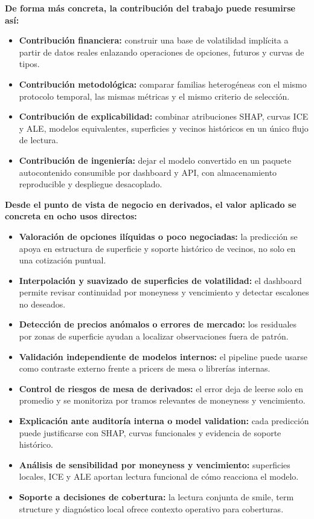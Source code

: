 \textbf{De forma más concreta, la contribución del trabajo puede resumirse así:}

\begin{itemize}
  \item \textbf{Contribución financiera:} construir una base de volatilidad implícita a partir de datos reales enlazando operaciones de opciones, futuros y curvas de tipos.
  \item \textbf{Contribución metodológica:} comparar familias heterogéneas con el mismo protocolo temporal, las mismas métricas y el mismo criterio de selección.
  \item \textbf{Contribución de explicabilidad:} combinar atribuciones SHAP, curvas ICE y ALE, modelos equivalentes, superficies y vecinos históricos en un único flujo de lectura.
  \item \textbf{Contribución de ingeniería:} dejar el modelo convertido en un paquete autocontenido consumible por dashboard y API, con almacenamiento reproducible y despliegue desacoplado.
\end{itemize}

\textbf{Desde el punto de vista de negocio en derivados, el valor aplicado se concreta en ocho usos directos:}

\begin{itemize}
  \item \textbf{Valoración de opciones ilíquidas o poco negociadas:} la predicción se apoya en estructura de superficie y soporte histórico de vecinos, no solo en una cotización puntual.
  \item \textbf{Interpolación y suavizado de superficies de volatilidad:} el dashboard permite revisar continuidad por moneyness y vencimiento y detectar escalones no deseados.
  \item \textbf{Detección de precios anómalos o errores de mercado:} los residuales por zonas de superficie ayudan a localizar observaciones fuera de patrón.
  \item \textbf{Validación independiente de modelos internos:} el pipeline puede usarse como contraste externo frente a pricers de mesa o librerías internas.
  \item \textbf{Control de riesgos de mesa de derivados:} el error deja de leerse solo en promedio y se monitoriza por tramos relevantes de moneyness y vencimiento.
  \item \textbf{Explicación ante auditoría interna o model validation:} cada predicción puede justificarse con SHAP, curvas funcionales y evidencia de soporte histórico.
  \item \textbf{Análisis de sensibilidad por moneyness y vencimiento:} superficies locales, ICE y ALE aportan lectura funcional de cómo reacciona el modelo.
  \item \textbf{Soporte a decisiones de cobertura:} la lectura conjunta de smile, term structure y diagnóstico local ofrece contexto operativo para coberturas.
\end{itemize}

